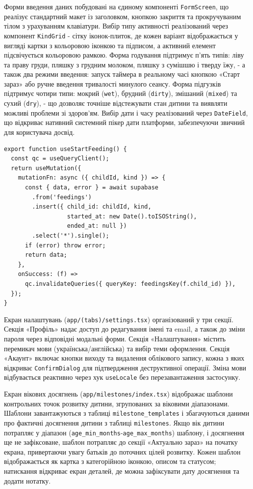 Форми введення даних побудовані на єдиному компоненті \texttt{FormScreen}, що реалізує стандартний макет із заголовком, кнопкою закриття та прокручуваним тілом з урахуванням клавіатури. Вибір типу активності реалізований через компонент \texttt{KindGrid} - сітку іконок-плиток, де кожен варіант відображається у вигляді картки з кольоровою іконкою та підписом, а активний елемент підсвічується кольоровою рамкою. Форма годування підтримує п'ять типів: ліву та праву груди, пляшку з грудним молоком, пляшку з сумішшю і тверду їжу, - а також два режими введення: запуск таймера в реальному часі кнопкою «Старт зараз» або ручне введення тривалості минулого сеансу. Форма підгузків підтримує чотири типи: мокрий (\texttt{wet}), брудний (\texttt{dirty}), змішаний (\texttt{mixed}) та сухий (\texttt{dry}), - що дозволяє точніше відстежувати стан дитини та виявляти можливі проблеми зі здоров'ям. Вибір дати і часу реалізований через \texttt{DateField}, що відкриває нативний системний пікер дати платформи, забезпечуючи звичний для користувача досвід.

\begin{verbatim}
export function useStartFeeding() {
  const qc = useQueryClient();
  return useMutation({
    mutationFn: async ({ childId, kind }) => {
      const { data, error } = await supabase
        .from('feedings')
        .insert({ child_id: childId, kind,
                  started_at: new Date().toISOString(),
                  ended_at: null })
        .select('*').single();
      if (error) throw error;
      return data;
    },
    onSuccess: (f) =>
      qc.invalidateQueries({ queryKey: feedingsKey(f.child_id) }),
  });
}
\end{verbatim}

Екран налаштувань (\texttt{app/(tabs)/settings.tsx}) організований у три секції. Секція «Профіль» надає доступ до редагування імені та email, а також до зміни пароля через відповідні модальні форми. Секція «Налаштування» містить перемикач мови (українська/англійська) та вибір теми оформлення. Секція «Акаунт» включає кнопки виходу та видалення облікового запису, кожна з яких відкриває \texttt{ConfirmDialog} для підтвердження деструктивної операції. Зміна мови відбувається реактивно через хук \texttt{useLocale} без перезавантаження застосунку.

Екран вікових досягнень (\texttt{app/milestones/index.tsx}) відображає шаблони контрольних точок розвитку дитини, згрупованих за віковими діапазонами. Шаблони завантажуються з таблиці \texttt{milestone\_templates} і збагачуються даними про фактичні досягнення дитини з таблиці \texttt{milestones}. Якщо вік дитини потрапляє у діапазон (\texttt{age\_min\_months}-\texttt{age\_max\_months}) шаблону, і досягнення ще не зафіксоване, шаблон потрапляє до секції «Актуально зараз» на початку екрана, привертаючи увагу батьків до поточних цілей розвитку. Кожен шаблон відображається як картка з категорійною іконкою, описом та статусом; натискання відкриває екран деталей, де можна зафіксувати дату досягнення та додати нотатку.

